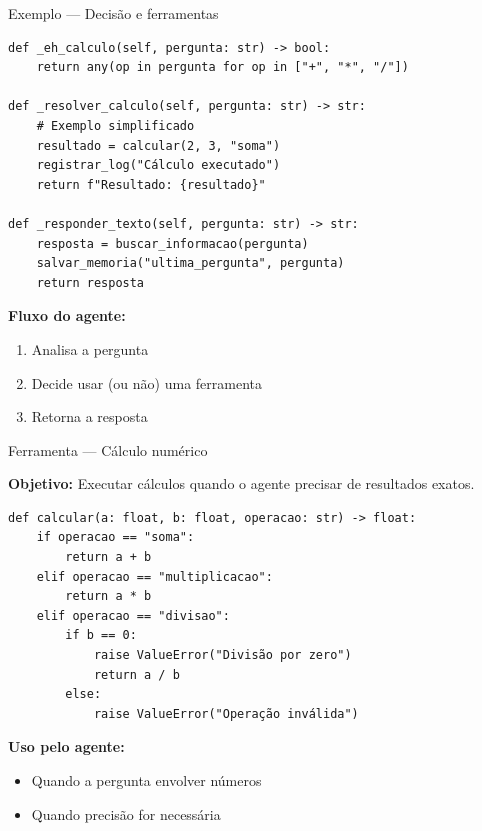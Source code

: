 \documentclass{beamer}
\begin{document}
\begin{frame}[fragile]{Exemplo — Decisão e ferramentas}
    
    \begin{verbatim}
def _eh_calculo(self, pergunta: str) -> bool:
    return any(op in pergunta for op in ["+", "*", "/"])

def _resolver_calculo(self, pergunta: str) -> str:
    # Exemplo simplificado
    resultado = calcular(2, 3, "soma")
    registrar_log("Cálculo executado")
    return f"Resultado: {resultado}"

def _responder_texto(self, pergunta: str) -> str:
    resposta = buscar_informacao(pergunta)
    salvar_memoria("ultima_pergunta", pergunta)
    return resposta
    \end{verbatim}
    
    \vspace{0.3cm}
    
    \textbf{Fluxo do agente:}
    \begin{enumerate}
        \item Analisa a pergunta
        \item Decide usar (ou não) uma ferramenta
        \item Retorna a resposta
    \end{enumerate}
    
\end{frame}


\begin{frame}[fragile]{Ferramenta — Cálculo numérico}
    
    \textbf{Objetivo:}  
    Executar cálculos quando o agente precisar de resultados exatos.
    
    \begin{verbatim}
def calcular(a: float, b: float, operacao: str) -> float:
    if operacao == "soma":
        return a + b
    elif operacao == "multiplicacao":
        return a * b
    elif operacao == "divisao":
        if b == 0:
            raise ValueError("Divisão por zero")
            return a / b
        else:
            raise ValueError("Operação inválida")
    \end{verbatim}
    
    \vspace{0.3cm}
    
    \textbf{Uso pelo agente:}
    \begin{itemize}
        \item Quando a pergunta envolver números
        \item Quando precisão for necessária
    \end{itemize}
    
\end{frame}
\end{document}
